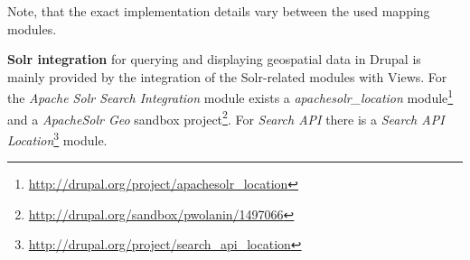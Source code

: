 Note, that the exact implementation details vary between the used mapping modules.

\textbf{Solr integration} for querying and displaying geospatial data in Drupal is mainly provided by the integration of the Solr-related modules with Views. For the \textit{Apache Solr Search Integration} module exists a \textit{apachesolr\_location} module\footnote{\url{http://drupal.org/project/apachesolr_location}} and a \textit{ApacheSolr Geo} sandbox project\footnote{\url{http://drupal.org/sandbox/pwolanin/1497066}}. For \textit{Search API} there is a \textit{Search API Location}\footnote{\url{http://drupal.org/project/search_api_location}} module.




